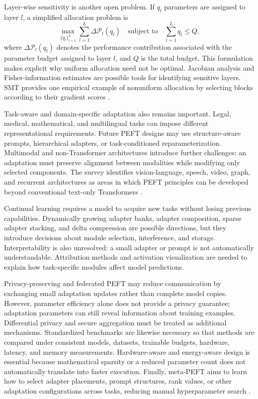 Layer-wise sensitivity is another open problem. If $q_l$ parameters are
assigned to layer $l$, a simplified allocation problem is
\begin{equation}
    \max_{\{q_l\}_{l=1}^{L}}
    \sum_{l=1}^{L}\Delta\mathcal{P}_l(q_l)
    \quad
    \text{subject to}
    \quad
    \sum_{l=1}^{L}q_l\leq Q,
    \label{eq:peft-layer-allocation}
\end{equation}
where $\Delta\mathcal{P}_l(q_l)$ denotes the performance contribution
associated with the parameter budget assigned to layer $l$, and $Q$ is the
total budget. This formulation makes explicit why uniform allocation need
not be optimal. Jacobian analysis and Fisher-information estimates are
possible tools for identifying sensitive layers. SMT provides one empirical
example of nonuniform allocation by selecting blocks according to their
gradient scores \parencite{prottasha2025peft,he2025smt}.

Task-aware and domain-specific adaptation also remains important. Legal,
medical, mathematical, and multilingual tasks can impose different
representational requirements. Future PEFT designs may use structure-aware
prompts, hierarchical adapters, or task-conditioned reparameterization.
Multimodal and non-Transformer architectures introduce further challenges:
an adaptation must preserve alignment between modalities while modifying
only selected components. The survey identifies vision-language, speech,
video, graph, and recurrent architectures as areas in which PEFT principles
can be developed beyond conventional text-only Transformers
\parencite{prottasha2025peft}.

Continual learning requires a model to acquire new tasks without losing
previous capabilities. Dynamically growing adapter banks, adapter
composition, sparse adapter stacking, and delta compression are possible
directions, but they introduce decisions about module selection, interference,
and storage. Interpretability is also unresolved: a small adapter or prompt
is not automatically understandable. Attribution methods and activation
visualization are needed to explain how task-specific modules affect model
predictions.

Privacy-preserving and federated PEFT may reduce communication by exchanging
small adaptation updates rather than complete model copies. However,
parameter efficiency alone does not provide a privacy guarantee; adaptation
parameters can still reveal information about training examples. Differential
privacy and secure aggregation must be treated as additional mechanisms.
Standardized benchmarks are likewise necessary so that methods are compared
under consistent models, datasets, trainable budgets, hardware, latency, and
memory measurements. Hardware-aware and energy-aware design is essential
because mathematical sparsity or a reduced parameter count does not
automatically translate into faster execution. Finally, meta-PEFT aims to
learn how to select adapter placements, prompt structures, rank values, or
other adaptation configurations across tasks, reducing manual
hyperparameter search \parencite{prottasha2025peft}.

